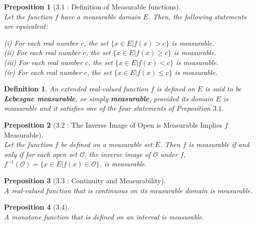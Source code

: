 \documentclass{article} %
\theoremstyle{quest}
\newtheorem*{definition}{Definition}
\newtheorem*{preposition}{Preposition}
\begin{document}
\begin{preposition}[3.1 : Definition of Measurable functions] ~\\
Let the function $f$ have a measurable domain $E$. Then, the following
statements are equivalent: \\
\begin{center}
\textit{(i)} For each real number $c$, the set $\{ x \in E | f(x) > c \}$ is measurable. \\
\textit{(ii)} For each real number $c$, the set $\{ x \in E | f(x) \geq c \}$ is measurable. \\
\textit{(iii)} For each real number $c$, the set $\{ x \in E | f(x) < c \}$ is measurable. \\
\textit{(iv)} For each real number $c$, the set $\{ x \in E | f(x) \leq c \}$ is measurable.\\
\end{center}
\end{preposition}

\bigskip

\begin{definition}
An extended real-valued function $f$ is defined on $E$ is said to be \textbf{Lebesgue measurable},
or simply \textbf{measurable}, provided its domain $E$ is measurable and it satisfies one of the
four statements of Preposition $3.1$.
\end{definition}

\bigskip

\begin{preposition}[3.2 : The Inverse Image of Open is Measurable Implies $f$ Measurable] ~\\ 
Let the function $f$ be defined on a measurable set $E$. Then $f$ is measurable if and only if
for each open set $\mathcal{O}$, the inverse image of $\mathcal{O}$ under $f$, $f^{-1}(\mathcal{O})
= \{ x \in E | f(x) \in \mathcal{O} \}$, is measurable.
\end{preposition}

\bigskip 

\begin{preposition}[3.3 : Continuity and Measurability] ~\\ 
A real-valued function that is continuous on its measurable domain is measurable.
\end{preposition}

\bigskip

\begin{preposition}[3.4] ~\\
A monotone function that is defined on an interval is measurable.
\end{preposition}
\end{document}
